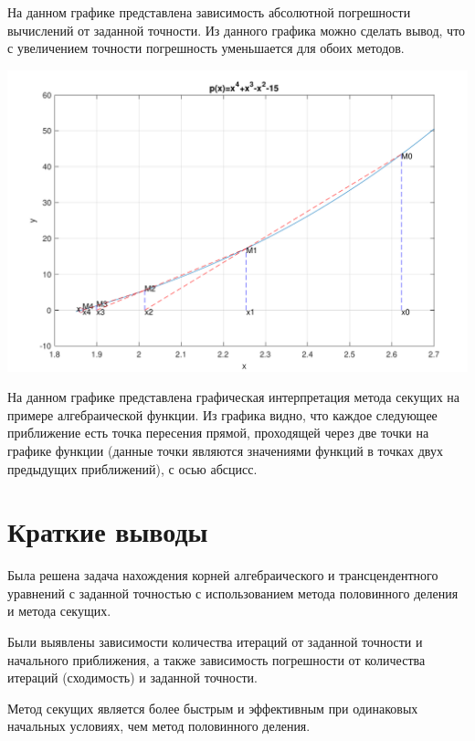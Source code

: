 На данном графике представлена зависимость абсолютной погрешности вычислений от заданной точности. Из данного графика можно сделать вывод, что с увеличением точности погрешность уменьшается для обоих методов. 

\includegraphics[scale=0.75]{9.pdf}

На данном графике представлена графическая интерпретация метода секущих на примере алгебраической функции. Из графика видно, что каждое следующее приближение есть точка пересения прямой, проходящей через две точки на графике функции (данные точки являются значениями функций в точках двух предыдущих приближений), с осью абсцисс. 

\section{Краткие выводы}

Была решена задача нахождения корней алгебраического и трансцендентного уравнений с заданной точностью с использованием метода половинного деления и метода секущих.

Были выявлены зависимости количества итераций от заданной точности и начального приближения, а также зависимость погрешности от количества итераций (сходимость) и заданной точности.

Метод секущих является более быстрым и эффективным при одинаковых начальных условиях, чем метод половинного деления.




